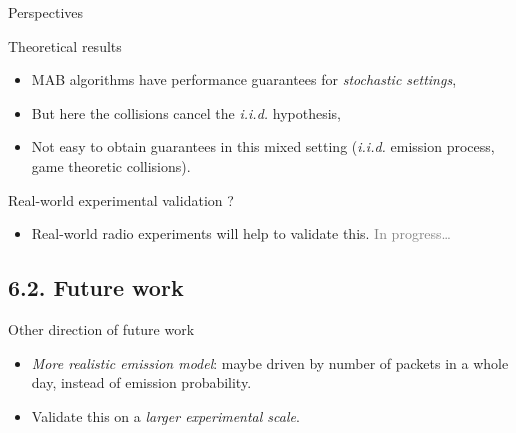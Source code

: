 \documentclass[12pt,english,ignorenonframetext,aspectratio=169,]{beamer}
\providecommand{\tightlist}{%
  \setlength{\itemsep}{0pt}\setlength{\parskip}{0pt}}
\begin{document}
\begin{frame}{Perspectives}

\begin{block}{Theoretical results}

\begin{itemize}
\tightlist
\item
  MAB algorithms have performance guarantees for \emph{stochastic
  settings},
\item
  But here the collisions cancel the \emph{i.i.d.} hypothesis,
\item
  Not easy to obtain guarantees in this mixed setting \newline
   (\emph{i.i.d.} emission process, game theoretic collisions).
\end{itemize}

\pause

\end{block}

\begin{block}{Real-world experimental validation ?}

\begin{itemize}
\tightlist
\item
  Real-world radio experiments will help to validate this. \newline
   \hspace*{40pt}\hfill{}\textcolor{gray}{In progress\dots}
\end{itemize}

\end{block}

\end{frame}



\subsection{\hfill{}6.2. Future work\hfill{}}

\begin{frame}{Other direction of future work}

\begin{itemize}
\item
  \emph{More realistic emission model}: maybe driven by number of
  packets in a whole day, instead of emission probability.
\item
  Validate this on a \emph{larger experimental scale}.
\end{itemize}

\end{frame}
\end{document}
